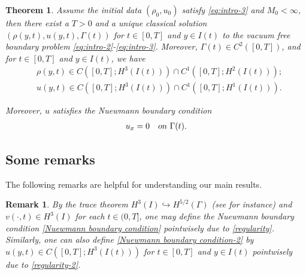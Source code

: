 \documentclass[11pt, reqno]{amsart}
\newtheorem{theorem}{Theorem}[section]
\newtheorem{remark}{Remark}
\numberwithin{equation}{section}
\begin{document}
\begin{theorem}\label{th:main-2} Assume the initial data \((\rho_0,u_0)\) satisfy \eqref{eq:intro-3} and \(M_0<\infty\), then
there exist a \(T>0\) and a unique classical solution \((\rho(y,t), u(y,t), \Gamma(t))\) for \(t\in[0,T]\) and \(y\in I(t)\) to the vacuum free
boundary problem \eqref{eq:intro-2}-\eqref{eq:intro-3}. Moreover, \(\Gamma(t)\in C^2([0,T])\), and for \(t\in[0,T]\) and \(y\in I(t)\), we have
\begin{equation}\label{regularity-2}
\begin{aligned}
&\rho(y,t)\in C([0,T];H^3(I(t)))\cap C^1([0,T];H^2(I(t)));\\
&u(y,t)\in C([0,T];H^3(I(t)))\cap C^1([0,T];H^1(I(t))).
\end{aligned}
\end{equation}

Moreover, \(u\) satisfies the Nuewmann boundary condition
\begin{align}\label{Nuewmann boundary condition-2}
u_x=0 \quad \rm{on}\ \Gamma(t).
\end{align}




\end{theorem}


\subsection{Some remarks}
The following remarks are helpful for understanding our main results.


\begin{remark}\label{re:main-1}
By the trace theorem \(H^3(I)\hookrightarrow H^{5/2}(\Gamma)\) (see \cite{MR2597943} for instance) and \(v(\cdot,t)\in H^3(I)\) for each \(t\in(0,T]\), one may define the Nuewmann boundary condition \eqref{Nuewmann boundary condition} pointwisely due to \eqref{regularity}. Similarly, one can also define \eqref{Nuewmann boundary condition-2} by \(u(y,t)\in C([0,T];H^3(I(t)))\) for  \(t\in[0,T]\) and \(y\in I(t)\) pointwisely due to \eqref{regularity-2}. 

	
\end{remark}
\end{document}
